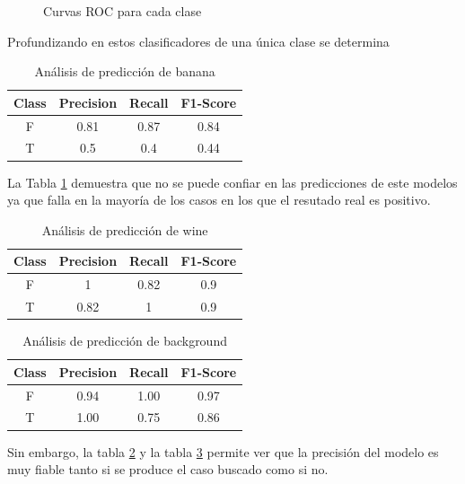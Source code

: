 \documentclass{esannV2}
\begin{document}
\begin{figure}[b!]
\caption{Curvas ROC para cada clase}\label{fig:roc}
\end{figure}

Profundizando en estos clasificadores de una única clase se determina 
\begin{table}[!]
  \centering
  \begin{tabular}{|c|c|c|c|}
    \hline
    Class & Precision & Recall & F1-Score \\
    \hline
    F & 0.81 & 0.87 & 0.84 \\ \hline
    T & 0.5 & 0.4 & 0.44 \\  
    \hline
  \end{tabular}
  \caption{Análisis de predicción de banana}\label{tab:banana}
\end{table}

La Tabla \ref{tab:banana} demuestra que no se puede confiar en las predicciones de este modelos ya que falla en la mayoría de los casos en los que el resutado real es positivo.

\begin{table}[!]
  \centering
  \begin{tabular}{|c|c|c|c|}
    \hline
    Class & Precision & Recall & F1-Score \\
    \hline
    F & 1 & 0.82 & 0.9 \\ \hline
    T & 0.82 & 1 & 0.9 \\  
    \hline
  \end{tabular}
  \caption{Análisis de predicción de wine}\label{tab:wine}
\end{table}


\begin{table}[!]
  \centering
  \begin{tabular}{|c|c|c|c|}
    \hline
    Class & Precision & Recall & F1-Score \\
    \hline
    F & 0.94 & 1.00 & 0.97 \\ \hline
    T & 1.00 & 0.75 & 0.86 \\  
    \hline
  \end{tabular}
  \caption{Análisis de predicción de background}\label{tab:background}
\end{table}

Sin embargo, la tabla \ref{tab:wine} y la tabla \ref{tab:background} permite ver que la precisión del modelo es muy fiable tanto si se produce el caso buscado como si no.
\end{document}
